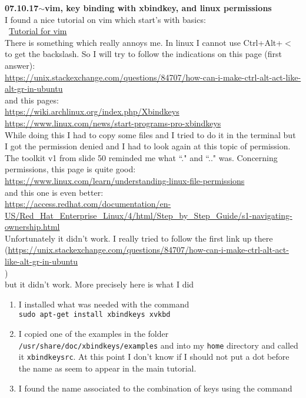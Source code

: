 \documentclass[11pt,a4paper]{article}
\newenvironment{loggentry}[2]%
{\noindent\textbf{#1}\hspace{1cm}$\mathbf{\sim}$\text{ }\textbf{#2}\\}{\vspace{0.5cm}}
\begin{document}
\begin{loggentry}{07.10.17}{vim, key binding with xbindkey, and linux permissions}
I found a nice tutorial on vim which start's with basics:\\\
\href{https://www.linux.com/learn/vim-101-beginners-guide-vim}{Tutorial for vim}\\
There is something which really annoys me. In linux I cannot use Ctrl+Alt+$<$ to get the backslash. So I will try to follow the indications on this page (first answer):\\
\url{https://unix.stackexchange.com/questions/84707/how-can-i-make-ctrl-alt-act-like-alt-gr-in-ubuntu}\\
and this pages:\\
\url{https://wiki.archlinux.org/index.php/Xbindkeys}\\
\url{https://www.linux.com/news/start-programs-pro-xbindkeys}\\
While doing this I had to copy some files and I tried to do it in the terminal but I got the permission denied and I had to look again at this topic of permission. The toolkit v1 from slide 50 reminded me what ``." and ``.." was. Concerning permissions, this page is quite good:\\
\url{https://www.linux.com/learn/understanding-linux-file-permissions}\\
and this one is even better:\\
\url{https://access.redhat.com/documentation/en-US/Red_Hat_Enterprise_Linux/4/html/Step_by_Step_Guide/s1-navigating-ownership.html}\\
Unfortunately it didn't work. I really tried to follow the first link up there\\
(\url{https://unix.stackexchange.com/questions/84707/how-can-i-make-ctrl-alt-act-like-alt-gr-in-ubuntu}\\)\\
but it didn't work. 
More precisely here is what I did
\begin{enumerate}[1)]
\item I installed what was needed with the command\\
\texttt{sudo apt-get install xbindkeys xvkbd}
\item I copied one of the examples in the folder \texttt{/usr/share/doc/xbindkeys/examples} and into my \texttt{home} directory and called it \texttt{xbindkeysrc}. At this point I don't know if I should not put a dot before the name as seem to appear in the main tutorial.
\item I found the name associated to the combination of keys using the command\\

\end{enumerate}
\end{loggentry}
\end{document}

